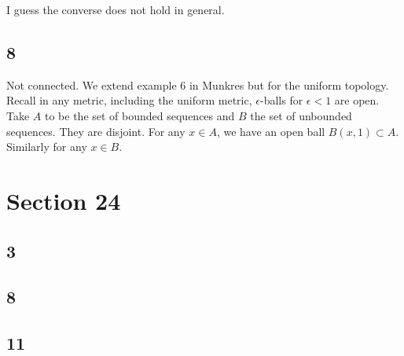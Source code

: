 \documentclass[12pt]{extarticle}
\begin{document}
I guess the converse does not hold in general.


\subsection{8}

Not connected. We extend example 6 in Munkres but for the uniform topology. Recall in any metric, including the uniform metric, $\epsilon$-balls for $\epsilon < 1$ are open. Take $A$ to be the set of bounded sequences and $B$ the set of unbounded sequences. They are disjoint. For any $x \in A$, we have an open ball $B(x,1) \subset A$. Similarly for any $x \in B$.


\section{Section 24}

\subsection{3}

\subsection{8}

\subsection{11}
\end{document}
